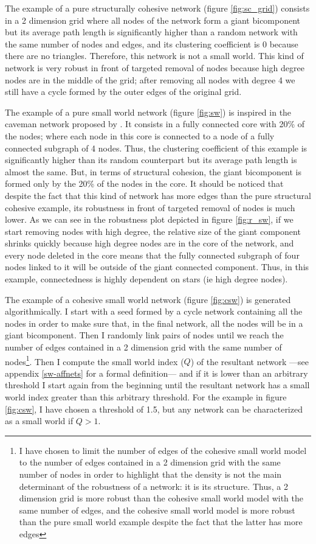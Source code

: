 The example of a pure structurally cohesive network (figure \ref{fig:sc_grid}) consists in a 2 dimension grid where all nodes of the network form a giant bicomponent but its average path length is significantly higher than a random network with the same number of nodes and edges, and its clustering coefficient is 0 because there are no triangles. Therefore, this network is not a small world. This kind of network is very robust in front of targeted removal of nodes because high degree nodes are in the middle of the grid; after removing all nodes with degree 4 we still have a cycle formed by the outer edges of the original grid.

The example of a pure small world network (figure \ref{fig:sw}) is inspired in the caveman network proposed by \cite{watts:1999}. It consists in a fully connected core with 20\% of the nodes; where each node in this core is connected to a node of a fully connected subgraph of 4 nodes. Thus, the clustering coefficient of this example is significantly higher than its random counterpart but its average path length is almost the same. But, in terms of structural cohesion, the giant bicomponent is formed only by the 20\% of the nodes in the core. It should be noticed that despite the fact that this kind of network has more edges than the pure structural cohesive example, its robustness in front of targeted removal of nodes is much lower. As we can see in the robustness plot depicted in figure \ref{fig:r_sw}, if we start removing nodes with high degree, the relative size of the giant component shrinks quickly because high degree nodes are in the core of the network, and every node deleted in the core means that the fully connected subgraph of four nodes linked to it will be outside of the giant connected component. Thus, in this example, connectedness is highly dependent on stars (ie high degree nodes).

The example of a cohesive small world network (figure \ref{fig:csw}) is generated algorithmically. I start with a seed formed by a cycle network containing all the nodes in order to make sure that, in the final network, all the nodes will be in a giant bicomponent. Then I randomly link pairs of nodes until we reach the number of edges contained in a 2 dimension grid with the same number of nodes\footnote{I have chosen to limit the number of edges of the cohesive small world model to the number of edges contained in a 2 dimension grid with the same number of nodes in order to highlight that the density is not the main determinant of the robustness of a network: it is its structure. Thus, a 2 dimension grid is more robust than the cohesive small world model with the same number of edges, and the cohesive small world model is more robust than the pure small world example despite the fact that the latter has more edges}. Then I compute the small world index ($Q$) of the resultant network ---see appendix \ref{sw-affnets} for a formal definition--- and if it is lower than an arbitrary threshold I start again from the beginning until the resultant network has a small world index greater than this arbitrary threshold. For the example in figure \ref{fig:csw}, I have chosen a threshold of 1.5, but any network can be characterized as a small world if $Q > 1$.

